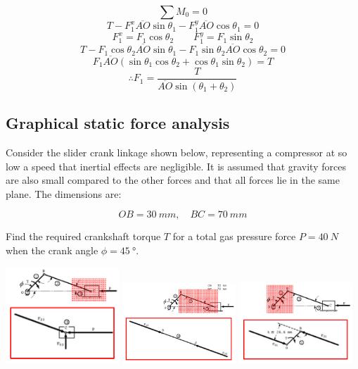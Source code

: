 \documentclass[11pt]{article}
\begin{document}
\[\sum M_0 = 0\]
\[T - F_1^x \overline{AO} \sin \theta_1 - F_1^y \overline{AO} \cos \theta_1 = 0\]
\[F_1^x = F_1 \cos \theta_2 \qquad F_1^y = F_1 \sin \theta_2\]
\[T - F_1 \cos \theta_2 \overline{AO} \sin \theta_1 - F_1 \sin \theta_2 \overline{AO} \cos \theta_2 = 0\]
\[F_1 \overline{AO} (\sin \theta_1 \cos \theta_2 + \cos \theta_1 \sin \theta_2) = T\]
\[\therefore F_1 = \frac{T}{\overline{AO} \sin (\theta_1 + \theta_2)}\]

 \newpage
\subsection{Graphical static force analysis}
\label{sec:orgb1fee79}
Consider the slider crank linkage shown below, representing a compressor at so low a speed that inertial effects are negligible. It is assumed that gravity forces are also small compared to the other forces and that all forces lie in the same plane. The dimensions are:

\[OB = \qty{30}{mm}, \quad BC = \qty{70}{mm}\]

Find the required crankshaft torque \(T\) for a total gas pressure force \(P = \qty{40}{N}\) when the crank angle \(\phi = \qty{45}{\degree}\).

\begin{center}
\includegraphics[width=0.32\textwidth]{./images/graphical-static-force-analysis-link-1.png}
\includegraphics[width=0.32\textwidth]{./images/graphical-static-force-analysis-link-2.png}
\includegraphics[width=0.32\textwidth]{./images/graphical-static-force-analysis-link-3.png}
\end{center}
\end{document}
